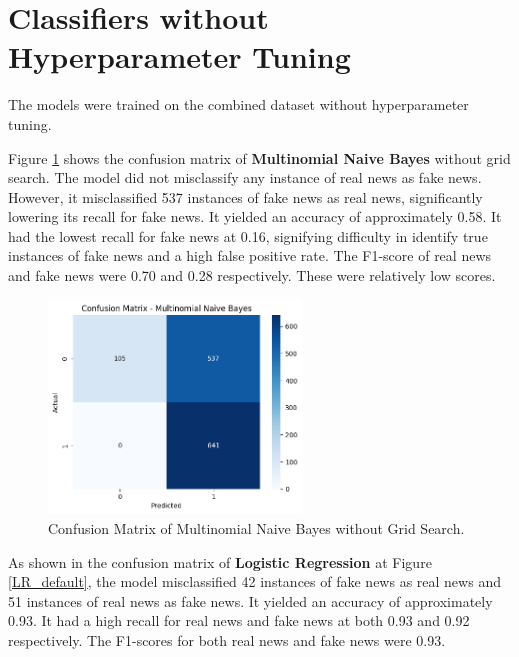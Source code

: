 \section{Classifiers without Hyperparameter Tuning}

The models were trained on the combined dataset without hyperparameter tuning.

Figure \ref{MNB_default} shows the confusion matrix of \textbf{Multinomial Naive Bayes} without grid search. The model did not misclassify any instance of real news as fake news. However, it misclassified 537 instances of fake news as real news, significantly lowering its recall for fake news. It yielded an accuracy of approximately 0.58. It had the lowest recall for fake news at 0.16, signifying difficulty in identify true instances of fake news and a high false positive rate. The F1-score of real news and fake news were 0.70 and 0.28 respectively. These were relatively low scores.

\begin{figure}[h!]
    \centering
    \includegraphics[width=0.6\textwidth,height=0.6\textheight, keepaspectratio]{figures/hyperparam/MNB_default.png}
        \caption{Confusion Matrix of Multinomial Naive Bayes without Grid Search.}
        \label{MNB_default}
\end{figure}

As shown in the confusion matrix of \textbf{Logistic Regression} at Figure \ref{LR_default}, the model misclassified 42 instances of fake news as real news and 51 instances of real news as fake news. It yielded an accuracy of approximately 0.93. It had a high recall for real news and fake news at both 0.93 and 0.92 respectively. The F1-scores for both real news and fake news were 0.93.

